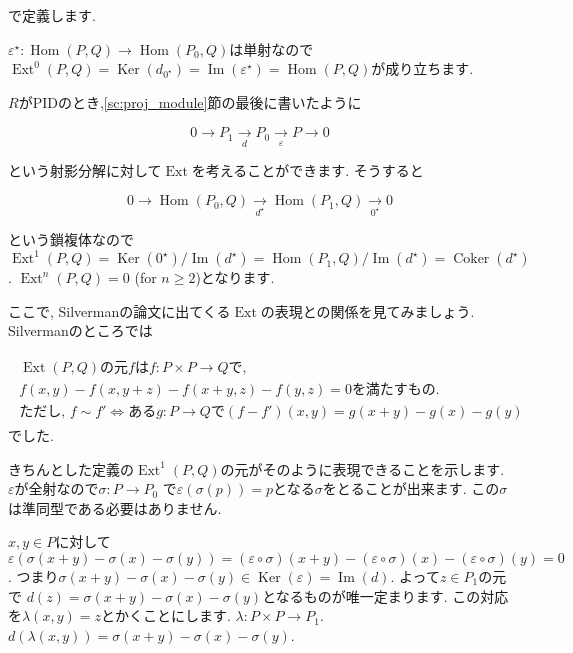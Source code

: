 \documentclass{jsarticle}
\newcommand{\makeop}[1]{\mathop{\mathrm{#1}}\nolimits}
\def\Im{\makeop{Im}}
\def\Ker{\makeop{Ker}}
\def\Hom{\makeop{Hom}}
\def\Ext{\makeop{Ext}}
\def\Coker{\makeop{Coker}}
\theoremstyle{definition}
\numberwithin{theorem}{section}
\begin{document}
で定義します. 

$\varepsilon^\star: \Hom(P, Q) \rightarrow \Hom(P_0, Q)$は単射なので
$\Ext^0(P, Q) = \Ker(d_{0^\star}) = \Im(\varepsilon^\star) = \Hom(P, Q)$が成り立ちます.

$R$がPIDのとき,\ref{sc:proj_module}節の最後に書いたように

\begin{equation*}
0 \rightarrow P_1 \xrightarrow[d]{} P_0 \xrightarrow[\varepsilon]{} P \rightarrow 0
\end{equation*}

という射影分解に対して$\Ext$を考えることができます. そうすると

\begin{equation*}
0 \rightarrow \Hom(P_0, Q) \xrightarrow[d^\star]{} \Hom(P_1, Q) \xrightarrow[0^\star]{} 0
\end{equation*}

という鎖複体なので
$\displaystyle \Ext^1(P, Q) = \Ker(0^\star)/\Im(d^\star) = \Hom(P_1, Q)/\Im(d^\star) = \Coker(d^\star)$.
$\Ext^n(P, Q) = 0$ (for $n \geq 2$)となります. 

ここで, Silvermanの論文に出てくる$\Ext$の表現との関係を見てみましょう. Silvermanのところでは

\begin{eqnarray}
\label{eq:silverman_ext_def}
\begin{array}{c}
\Ext(P, Q)\mbox{の元}fはf: P\times P \rightarrow Qで, \\
f(x, y) - f(x, y+z) - f(x+y, z) - f(y, z) = 0\mbox{を満たすもの.}\\
\mbox{ただし, }f\sim f' \Leftrightarrow ある g:P\rightarrow Qで(f-f')(x, y) = g(x+y) - g(x) - g(y)
\end{array}
\end{eqnarray}
でした.

きちんとした定義の$\Ext^1(P, Q)$の元がそのように表現できることを示します. $\varepsilon$が全射なので$\sigma : P \rightarrow P_0$
で$\varepsilon(\sigma(p)) = p$となる$\sigma$をとることが出来ます. この$\sigma$は準同型である必要はありません.

$x, y \in P$に対して
$\varepsilon(\sigma(x+y) - \sigma(x) - \sigma(y)) = (\varepsilon\circ\sigma)(x+y) - (\varepsilon\circ\sigma)(x) - (\varepsilon\circ\sigma)(y) = 0$.
つまり$\sigma(x+y) - \sigma(x) - \sigma(y) \in \Ker(\varepsilon) = \Im(d)$. よって$z\in P_1$の元で
$d(z) = \sigma(x+y) - \sigma(x) - \sigma(y)$となるものが唯一定まります. この対応を$\lambda(x, y) = z$とかくことにします.
$\lambda: P\times P \rightarrow P_1$. $d(\lambda(x, y)) = \sigma(x+y) - \sigma(x) - \sigma(y)$.
\end{document}
